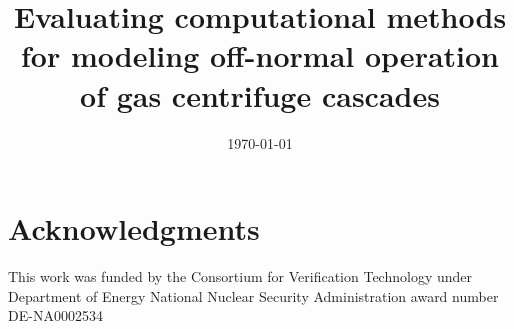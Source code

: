 \documentclass[review]{./elsarticle}
\begin{document}
\begin{frontmatter}

    


\date{\today}

\title{Evaluating computational methods for modeling off-normal operation of gas centrifuge cascades}





\end{frontmatter}

\linenumbers

\maketitle













\section{Acknowledgments}
This work was funded by the Consortium for Verification Technology under
Department of Energy National Nuclear Security Administration award number
DE-NA0002534



%

\begin{small}
\end{small}
\end{document}
